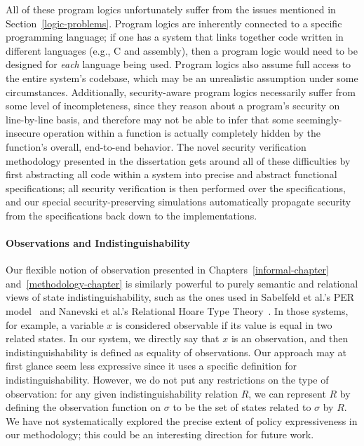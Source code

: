 All of these program logics unfortunately suffer from the issues mentioned 
in Section~\ref{logic-problems}. Program logics are inherently connected
to a specific programming language; if one has a system that links together
code written in different languages (e.g., C and assembly), then a program 
logic would need to be designed for \emph{each} language being used.
Program logics also assume full access to the entire system's codebase, which 
may be an unrealistic assumption under some circumstances. Additionally, 
security-aware program logics necessarily suffer from some level of
incompleteness, since they reason about a program's security on line-by-line
basis, and therefore may not be able to infer that some seemingly-insecure
operation within a function is actually completely hidden by the function's 
overall, end-to-end behavior. The novel security verification methodology
presented in the dissertation gets around all of these difficulties by
first abstracting all code within a system into precise and abstract
functional specifications; all security verification is then performed
over the specifications, and our special security-preserving simulations
automatically propagate security from the specifications back down to
the implementations.

\paragraph{Observations and Indistinguishability}
Our flexible notion of observation presented in
Chapters~\ref{informal-chapter} and~\ref{methodology-chapter} is similarly 
powerful to purely semantic and relational views of state indistinguishability,
such as the ones used in Sabelfeld et al.'s PER model~\cite{sabelfeld99} 
and Nanevski et al.'s Relational Hoare Type Theory~\cite{rhtt}.
In those systems, for example, a variable $x$ is considered observable 
if its value is equal in two related states. In our system, we
directly say that $x$ is an observation, and then indistinguishability
is defined as equality of observations. Our approach may at first 
glance seem less expressive since it uses a specific definition
for indistinguishability. However, we do not put any restrictions 
on the type of observation: for any given indistinguishability
relation $R$, we can represent $R$ by defining the observation 
function on $\sigma$ to be the set of states related to $\sigma$ by $R$.
We have not systematically explored the precise extent of policy 
expressiveness in our methodology; this could be an interesting 
direction for future work.

